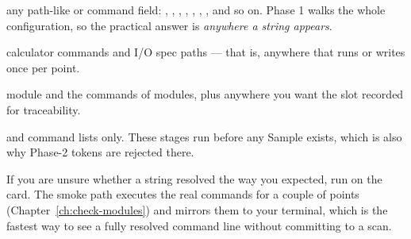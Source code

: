 \begin{keylist}
  \item[Phase-1 tokens] any path-like or command field: ,
        , , , ,
        , , and so on. Phase 1
        walks the whole configuration, so the practical answer is \emph{anywhere a string
        appears}.
  \item[\token{@SampleID}, \token{@Sdir}] calculator  commands and I/O
        spec paths --- that is, anywhere that runs or writes once per point.
  \item[\token{@PackID}] module  and the commands of
         modules, plus anywhere you want the slot recorded for
        traceability.
  \item[\code{\$\{source\}}, \code{\$\{path\}}]  and
         command lists only. These stages run before any Sample
        exists, which is also why Phase-2 tokens are rejected there.
\end{keylist}

\begin{jtip}
If you are unsure whether a string resolved the way you expected, run
 on the card. The smoke path executes the real commands for a couple
of points (Chapter~\ref{ch:check-modules}) and mirrors them to your terminal, which is
the fastest way to see a fully resolved command line without committing to a scan.
\end{jtip}

